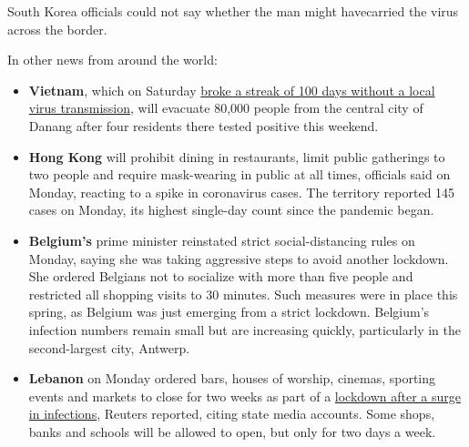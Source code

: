 South Korea officials could not say whether the man might have ​carried
the virus across the border.

In other news from around the world:

\begin{itemize}
\item
  \textbf{Vietnam}, which on Saturday
  \href{https://www.nytimes.com/2020/07/25/world/asia/coronavirus-vietnam.html}{broke
  a streak of 100 days without a local virus transmission}, will
  evacuate 80,000 people from the central city of Danang after four
  residents there tested positive this weekend.
\item
  \textbf{Hong Kong} will prohibit dining in restaurants, limit public
  gatherings to two people and require mask-wearing in public at all
  times, officials said on Monday, reacting to a spike in coronavirus
  cases. The territory reported 145 cases on Monday, its highest
  single-day count since the pandemic began.
\item
  \textbf{Belgium's} prime minister reinstated strict social-distancing
  rules on Monday, saying she was taking aggressive steps to avoid
  another lockdown. She ordered Belgians not to socialize with more than
  five people and restricted all shopping visits to 30 minutes. Such
  measures were in place this spring, as Belgium was just emerging from
  a strict lockdown. Belgium's infection numbers remain small but are
  increasing quickly, particularly in the second-largest city, Antwerp.
\end{itemize}

\begin{itemize}
\tightlist
\item
  \textbf{Lebanon} on Monday ordered bars, houses of worship, cinemas,
  sporting events and markets to close for two weeks as part of a
  \href{https://www.reuters.com/article/us-health-coronavirus-lebanon/lebanon-reimposes-covid-19-restrictions-as-infections-spike-idUSKCN24S2FV?il=0}{lockdown
  after a surge in infections}, Reuters reported, citing state media
  accounts. Some shops, banks and schools will be allowed to open, but
  only for two days a week.
\end{itemize}

